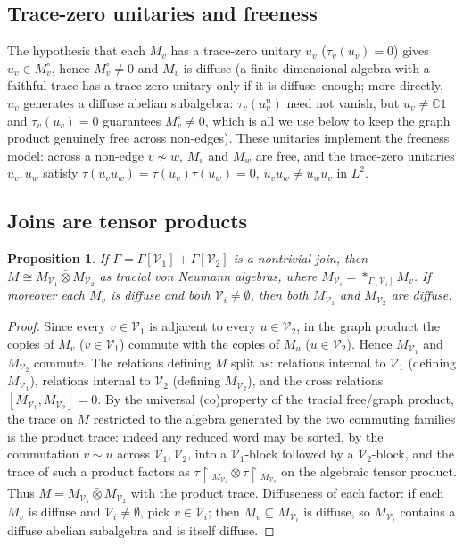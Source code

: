 \documentclass[11pt]{article}
\newtheorem{proposition}{Proposition}
\newcommand{\Gra}{\Gamma}
\newcommand{\VV}{\mathcal V}
\newcommand{\rest}{\!\restriction\!}
\begin{document}
\subsection*{Trace-zero unitaries and freeness}

The hypothesis that each $M_v$ has a trace-zero unitary $u_v$ ($\tau_v(u_v)=0$) gives $u_v\in M_v^\circ$,
hence $M_v^\circ\ne 0$ and $M_v$ is diffuse (a finite-dimensional algebra with a faithful trace has a
trace-zero unitary only if it is diffuse--enough; more directly, $u_v$ generates a diffuse abelian
subalgebra: $\tau_v(u_v^n)$ need not vanish, but $u_v\ne\mathbb C 1$ and $\tau_v(u_v)=0$ guarantees
$M_v^\circ\ne0$, which is all we use below to keep the graph product genuinely free across non-edges). These
unitaries implement the freeness model: across a non-edge $v\not\sim w$, $M_v$ and $M_w$ are free, and the
trace-zero unitaries $u_v,u_w$ satisfy $\tau(u_v u_w)=\tau(u_v)\tau(u_w)=0$, $u_vu_w\ne u_wu_v$ in $L^2$.

\subsection*{Joins are tensor products}

\begin{proposition}\label{prop:join-tensor}
If $\Gra=\Gra[\VV_1]+\Gra[\VV_2]$ is a nontrivial join, then
$M\cong M_{\VV_1}\bar\otimes M_{\VV_2}$ as tracial von Neumann algebras, where
$M_{\VV_i}=\ast_{\Gra[\VV_i]}M_v$. If moreover each $M_v$ is diffuse and both $\VV_i\ne\emptyset$, then both
$M_{\VV_1}$ and $M_{\VV_2}$ are diffuse.
\end{proposition}

\begin{proof}
Since every $v\in\VV_1$ is adjacent to every $u\in\VV_2$, in the graph product the copies of $M_v$
($v\in\VV_1$) commute with the copies of $M_u$ ($u\in\VV_2$). Hence $M_{\VV_1}$ and $M_{\VV_2}$ commute. The
relations defining $M$ split as: relations internal to $\VV_1$ (defining $M_{\VV_1}$), relations internal to
$\VV_2$ (defining $M_{\VV_2}$), and the cross relations $[M_{\VV_1},M_{\VV_2}]=0$. By the universal
(co)property of the tracial free/graph product, the trace on $M$ restricted to the algebra generated by the
two commuting families is the product trace: indeed any reduced word may be sorted, by the commutation
$v\sim u$ across $\VV_1,\VV_2$, into a $\VV_1$-block followed by a $\VV_2$-block, and the trace of such a
product factors as $\tau\rest_{M_{\VV_1}}\otimes\tau\rest_{M_{\VV_2}}$ on the algebraic tensor product. Thus
$M=M_{\VV_1}\bar\otimes M_{\VV_2}$ with the product trace. Diffuseness of each factor: if each $M_v$ is
diffuse and $\VV_i\ne\emptyset$, pick $v\in\VV_i$; then $M_v\subseteq M_{\VV_i}$ is diffuse, so $M_{\VV_i}$
contains a diffuse abelian subalgebra and is itself diffuse.
\end{proof}
\end{document}
